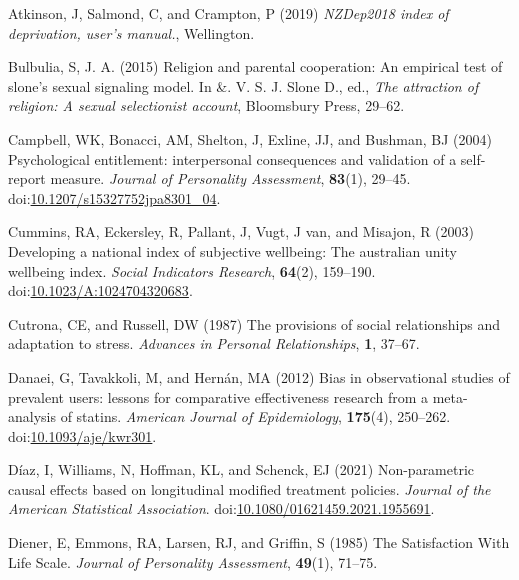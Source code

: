\documentclass[
  singlecolumn,
  9pt]{article}
\newlength{\cslhangindent}
\newlength{\cslentryspacingunit} %
\newenvironment{CSLReferences}[2] %
 {%
  \setlength{\parindent}{0pt}
  \ifodd #1
  \let\oldpar\par
  \def\par{\hangindent=\cslhangindent\oldpar}
  \fi
  \setlength{\parskip}{#2\cslentryspacingunit}
 }%
 {}
\begin{document}
\hypertarget{refs}{}
\begin{CSLReferences}{1}{0}
\leavevmode{}%
Atkinson, J, Salmond, C, and Crampton, P (2019) \emph{NZDep2018 index of
deprivation, user{'}s manual.}, Wellington.

\leavevmode{}%
Bulbulia, S, J. A. (2015) Religion and parental cooperation: An
empirical test of slone's sexual signaling model. In \&. V. S. J. Slone
D., ed., \emph{The attraction of religion: A sexual selectionist
account}, Bloomsbury Press, 29--62.

\leavevmode{}%
Campbell, WK, Bonacci, AM, Shelton, J, Exline, JJ, and Bushman, BJ
(2004) Psychological entitlement: interpersonal consequences and
validation of a self-report measure. \emph{Journal of Personality
Assessment}, \textbf{83}(1), 29--45.
doi:\href{https://doi.org/10.1207/s15327752jpa8301_04}{10.1207/s15327752jpa8301\_04}.

\leavevmode{}%
Cummins, RA, Eckersley, R, Pallant, J, Vugt, J van, and Misajon, R
(2003) Developing a national index of subjective wellbeing: The
australian unity wellbeing index. \emph{Social Indicators Research},
\textbf{64}(2), 159--190.
doi:\href{https://doi.org/10.1023/A:1024704320683}{10.1023/A:1024704320683}.

\leavevmode{}%
Cutrona, CE, and Russell, DW (1987) The provisions of social
relationships and adaptation to stress. \emph{Advances in Personal
Relationships}, \textbf{1}, 37--67.

\leavevmode{}%
Danaei, G, Tavakkoli, M, and Hernán, MA (2012) Bias in observational
studies of prevalent users: lessons for comparative effectiveness
research from a meta-analysis of statins. \emph{American Journal of
Epidemiology}, \textbf{175}(4), 250--262.
doi:\href{https://doi.org/10.1093/aje/kwr301}{10.1093/aje/kwr301}.

\leavevmode{}%
Díaz, I, Williams, N, Hoffman, KL, and Schenck, EJ (2021) Non-parametric
causal effects based on longitudinal modified treatment policies.
\emph{Journal of the American Statistical Association}.
doi:\href{https://doi.org/10.1080/01621459.2021.1955691}{10.1080/01621459.2021.1955691}.

\leavevmode{}%
Diener, E, Emmons, RA, Larsen, RJ, and Griffin, S (1985) The
Satisfaction With Life Scale. \emph{Journal of Personality Assessment},
\textbf{49}(1), 71--75.


\end{CSLReferences}
\end{document}
